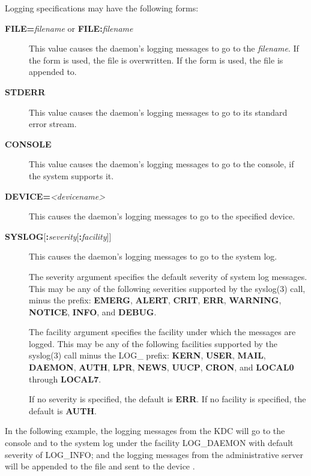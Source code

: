 \documentclass[letterpaper,10pt,english]{sphinxmanual}
\begin{document}
Logging specifications may have the following forms:
\begin{description}
\item[{\textbf{FILE=}\emph{filename} or \textbf{FILE:}\emph{filename}}] \leavevmode
This value causes the daemon's logging messages to go to the
\emph{filename}.  If the \code{=} form is used, the file is overwritten.
If the \code{:} form is used, the file is appended to.

\item[{\textbf{STDERR}}] \leavevmode
This value causes the daemon's logging messages to go to its
standard error stream.

\item[{\textbf{CONSOLE}}] \leavevmode
This value causes the daemon's logging messages to go to the
console, if the system supports it.

\item[{\textbf{DEVICE=}\emph{\textless{}devicename\textgreater{}}}] \leavevmode
This causes the daemon's logging messages to go to the specified
device.

\item[{\textbf{SYSLOG}{[}\textbf{:}\emph{severity}{[}\textbf{:}\emph{facility}{]}{]}}] \leavevmode
This causes the daemon's logging messages to go to the system log.

The severity argument specifies the default severity of system log
messages.  This may be any of the following severities supported
by the syslog(3) call, minus the  prefix: \textbf{EMERG},
\textbf{ALERT}, \textbf{CRIT}, \textbf{ERR}, \textbf{WARNING}, \textbf{NOTICE}, \textbf{INFO},
and \textbf{DEBUG}.

The facility argument specifies the facility under which the
messages are logged.  This may be any of the following facilities
supported by the syslog(3) call minus the LOG\_ prefix: \textbf{KERN},
\textbf{USER}, \textbf{MAIL}, \textbf{DAEMON}, \textbf{AUTH}, \textbf{LPR}, \textbf{NEWS},
\textbf{UUCP}, \textbf{CRON}, and \textbf{LOCAL0} through \textbf{LOCAL7}.

If no severity is specified, the default is \textbf{ERR}.  If no
facility is specified, the default is \textbf{AUTH}.

\end{description}

In the following example, the logging messages from the KDC will go to
the console and to the system log under the facility LOG\_DAEMON with
default severity of LOG\_INFO; and the logging messages from the
administrative server will be appended to the file
 and sent to the device .
\end{document}
